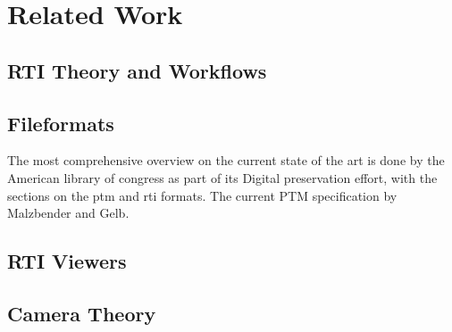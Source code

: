 \section{Related Work}

\subsection{RTI Theory and Workflows}

\subsection{Fileformats}\label{sec_relfile}
The most comprehensive overview on the current state of the art is done by the
American library of congress as part of its Digital preservation effort, with
the sections on the ptm\cite{library_of_congress_polynomial_2018} and
rti\cite{library_of_congress_reflectance_2018} formats. The current PTM
specification by Malzbender and Gelb\cite{malzbender_polynomial_nodate}.

\subsection{RTI Viewers}


\subsection{Camera Theory}
